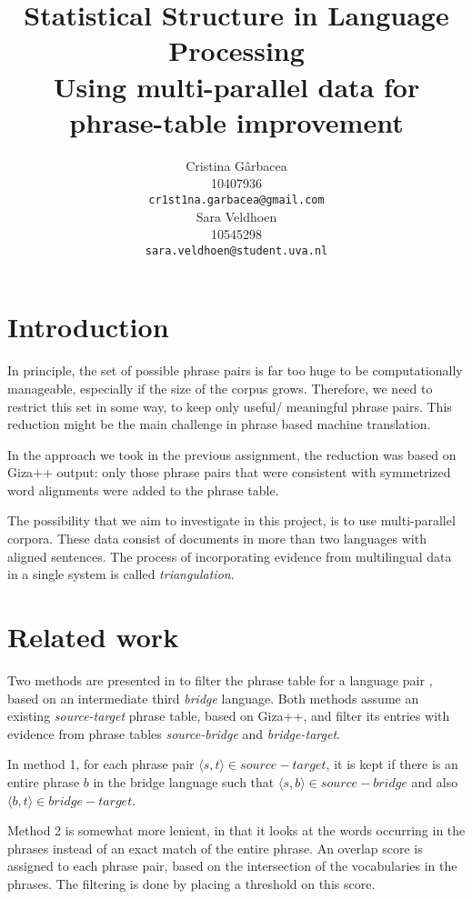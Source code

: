 \documentclass[11pt]{article}
\title{Statistical Structure in Language Processing \\Using multi-parallel data for phrase-table improvement}
\author{ Cristina G\^arbacea\\
  10407936 \\
  {\small \tt cr1st1na.garbacea@gmail.com} 
  \\\And
  Sara Veldhoen \\
10545298   \\
  {\small \tt sara.veldhoen@student.uva.nl} \\}
\date{}
\begin{document}
\maketitle


\section{Introduction}
In principle, the set of possible phrase pairs is far too huge to be computationally manageable, especially if the size of the corpus grows.
Therefore, we need to restrict this set in some way, to keep only useful/ meaningful phrase pairs. This reduction might be the main challenge in phrase based machine translation.

In the approach we took in the previous assignment, the reduction was based on Giza++ output: only those phrase pairs that were consistent with symmetrized word alignments were added to the phrase table.

The possibility that we aim to investigate in this project, is to use multi-parallel corpora. These data consist of documents in more than two languages with aligned sentences. The process of incorporating evidence from multilingual data in a single system is called \emph{triangulation}. 

\section{Related work}

Two methods are presented in \cite{chen} to filter the phrase table for a language pair%
, based on an intermediate third \emph{bridge} language. 
 Both methods assume an existing {\em source-target} phrase table, based on Giza++, and filter its entries with evidence from phrase tables {\em source-bridge} and {\em bridge-target}.

In method 1, for each phrase pair $\langle s, t\rangle \in source-target$, it is kept if there is an entire phrase $b$ in the bridge language such that $\langle s,b\rangle \in source-bridge$ and also $\langle b,t\rangle \in bridge-target$.

Method 2 is somewhat more lenient, in that it looks at the words occurring in the phrases instead of an exact match of the entire phrase. An overlap score is assigned to each phrase pair, based on the intersection of the vocabularies in the phrases. The filtering is done by placing a threshold on this score.
\end{document}
